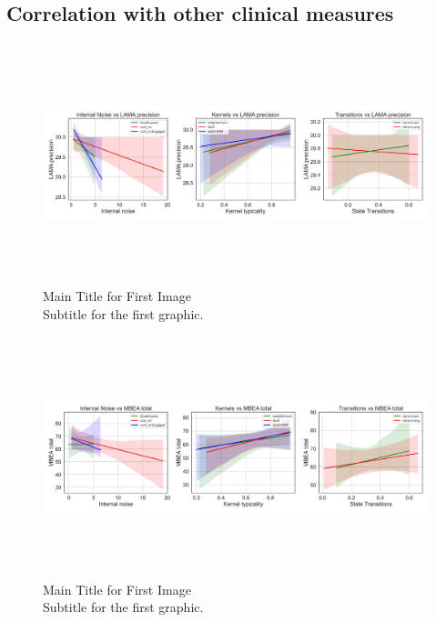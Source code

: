 \subsection {Correlation with other clinical measures} 
\begin{figure}[H]
    \centering
    \includegraphics[width=17cm,height=7cm]{MainLayout/Images/chapter8/regression_results_lama_prec.jpg}
    \caption{Main Title for First Image \\ \small Subtitle for the first graphic.}
    \label{fig:regression_results_lama_prec}
\end{figure}
\begin{figure}[H]
    \centering
    \includegraphics[width=17cm,height=7cm]{MainLayout/Images/chapter8/regression_results_mbea_total.jpg}
    \caption{Main Title for First Image \\ \small Subtitle for the first graphic.}
    \label{fig:regression_results_mbea_total}
\end{figure}

